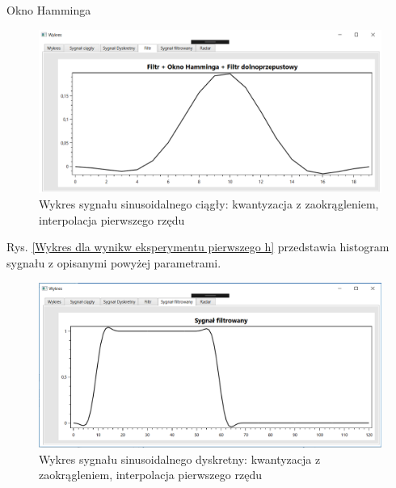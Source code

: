 \documentclass[12pt]{article}
\begin{document}
\newpage
Okno Hamminga
\begin{figure}[h!]
 \centering
 \includegraphics[width=12.3cm]{prostFDOHm.PNG}
 \vspace{-0.3cm}
 \caption{Wykres sygnału sinusoidalnego ciągły: kwantyzacja z zaokrągleniem, interpolacja pierwszego rzędu}
 \label{Wykres dla wyników eksperymentu drugiego}
\end{figure}
\newpage
Rys. \ref{Wykres dla wynikw eksperymentu pierwszego h} przedstawia histogram sygnału z opisanymi powyżej parametrami. 
\begin{figure}[h!]
 \centering
 \includegraphics[width=12.3cm]{prostSFDHm.PNG}
 \vspace{-0.3cm}
 \caption{Wykres sygnału sinusoidalnego dyskretny: kwantyzacja z zaokrągleniem, interpolacja pierwszego rzędu}
 \label{Histogram dla wyników eksperymentu drugiego}
\end{figure}
\end{document}
